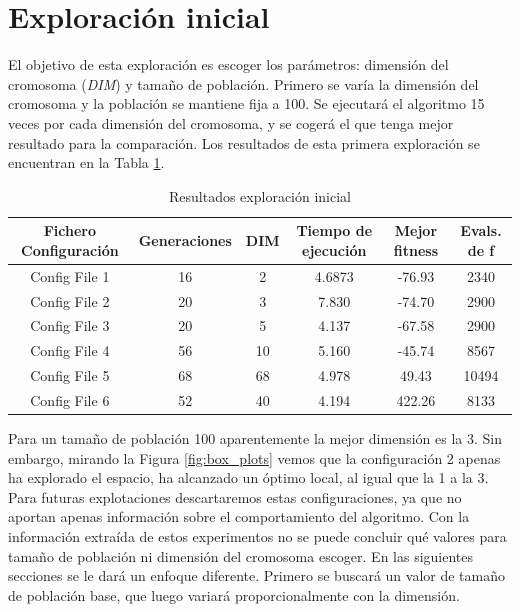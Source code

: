 \section{Exploración inicial}

El objetivo de esta exploración es escoger los parámetros: dimensión del cromosoma (\textit{DIM}) y tamaño de población. Primero se varía la dimensión
del cromosoma y la población se mantiene fija a 100. Se ejecutará el algoritmo 15 veces por cada dimensión del cromosoma, y se cogerá el que 
tenga mejor resultado para la comparación. Los resultados de esta primera exploración se encuentran en la Tabla \ref{tab:fitness_variation}. 

\begin{table}[]
    \centering
    \begin{tabular}{||c|c|c|c|c|c||}
        \hline
        \textbf{Fichero Configuración} & \textbf{Generaciones} & \textbf{DIM} & \textbf{Tiempo de ejecución} & \textbf{Mejor fitness} & \textbf{Evals. de f}\\ \hline
        Config File 1   & 16    & 2   & 4.6873  & -76.93    &  2340  \\ \hline
        Config File 2   & 20    & 3   & 7.830   & -74.70    &  2900  \\ \hline
        Config File 3   & 20    & 5   & 4.137   & -67.58    &  2900  \\ \hline
        Config File 4   & 56    & 10  & 5.160   & -45.74    &  8567  \\ \hline
        Config File 5   & 68    & 68  & 4.978   & 49.43     &  10494 \\ \hline
        Config File 6   & 52    & 40  & 4.194   & 422.26    &  8133  \\ \hline
    \end{tabular}
    \caption{Resultados exploración inicial}
    \label{tab:fitness_variation}
\end{table}

Para un tamaño de población 100 aparentemente la mejor dimensión es la 3. Sin embargo, mirando la Figura \ref{fig:box_plots} vemos
que la configuración 2 apenas ha explorado el espacio, ha alcanzado un óptimo local, al igual que la 1 a la 3. Para
futuras explotaciones descartaremos estas configuraciones, ya que no aportan apenas información sobre el comportamiento del algoritmo.
Con la información extraída de estos experimentos no se puede concluir qué valores para tamaño de población ni dimensión del cromosoma 
escoger. En las siguientes secciones se le dará un enfoque diferente. Primero se buscará un valor de
tamaño de población base, que luego variará proporcionalmente con la dimensión.


